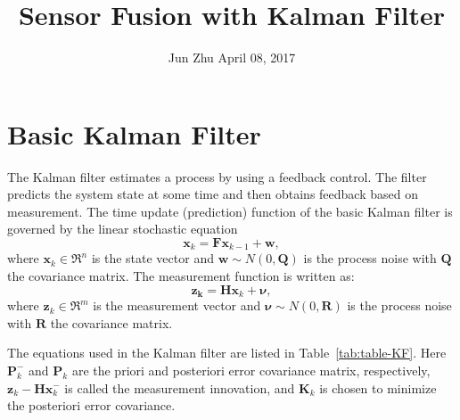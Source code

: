 \documentclass[12pt]{article}
\begin{document}
\title{Sensor Fusion with Kalman Filter}
\author{Jun Zhu April 08, 2017}


\section{Basic Kalman Filter}\label{basic-kalman-filter}

The Kalman filter estimates a process by using a feedback control. The filter predicts the system state at some time and then obtains feedback based on measurement. The time update (prediction) function of the basic Kalman filter is governed by the linear stochastic equation
%
\begin{equation}
	\mathbf{x}_{k} = \mathbf{F}\mathbf{x}_{k - 1} + \mathbf{w},
\end{equation}
%
where \(\mathbf{x}_{k} \in \mathfrak{R}^{n}\) is the state vector and \(\mathbf{w}\sim N( 0,\mathbf{Q})\) is the process noise with \(\mathbf{Q}\) the covariance matrix. The measurement function is written as:
%
\begin{equation}
	\mathbf{z}_{\mathbf{k}} = \mathbf{H}\mathbf{x}_{k} + \mathbf{\nu},
\end{equation}
%
where \(\mathbf{z}_{k} \in \mathfrak{R}^{m}\) is the measurement vector and \(\mathbf{\nu}\sim N( 0,\mathbf{R})\) is the process noise with \(\mathbf{R}\) the covariance matrix.

The equations used in the Kalman filter are listed in Table~\ref{tab:table-KF}. Here \(\mathbf{P}_{k}^{-}\) and \(\mathbf{P}_{k}\) are the priori and posteriori error covariance matrix, respectively, \(\mathbf{z}_{k} - \mathbf{H}\mathbf{x}_{k}^{-}\) is called the measurement innovation, and \(\mathbf{K}_{k}\) is chosen to minimize the posteriori error covariance.
\end{document}
